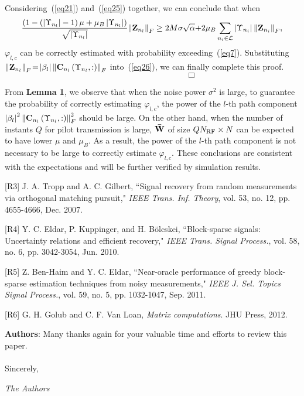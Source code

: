 \documentclass[a4paper,12pt]{article}
\begin{document}
{\begin{framed}
{\begin{equation}
\end{equation}
Considering~(\ref{eq21}) and~(\ref{eq25}) together, we can conclude that when
\begin{equation}\label{eq26}
\frac{{\left( {1 - \left( {\left| {{\Upsilon _{{n_l}}}} \right| - 1} \right)\mu  + {\mu _B}\left| {{\Upsilon _{{n_l}}}} \right|} \right)}}{{\sqrt {\left| {{\Upsilon _{{n_l}}}} \right|} }}{\left\| {{{\bf{Z}}_{{n_l}}}} \right\|_F} \ge 2M\sigma \sqrt \alpha  {\rm{ + }}2{\mu _B}\sum\limits_{{n_i} \in {\cal L}} {\left| {{\Upsilon _{{n_i}}}} \right|{{\left\| {{{\bf{Z}}_{{n_i}}}} \right\|}_F}} ,
\end{equation}
${{\varphi _{l,c}}}$  can be correctly estimated with probability exceeding~(\ref{eq7}). Substituting ${{\left\| {{{\bf{Z}}_{{n_l}}}} \right\|_F} \!=\! \left| {{\beta _l}} \right|{\left\| {{{\bf{C}}_{{n_l}}}\left( {{\Upsilon _{{n_l}}},:} \right)} \right\|_F}}$ into~(\ref{eq26}), we can finally complete this proof. ${\quad \quad \quad \quad \quad \quad \quad \quad \quad \quad \quad \quad \quad \quad \quad \quad \quad \quad \quad \quad \quad \; \; \; \; \Box}$

From \textbf{Lemma 1}, we observe that when the noise power ${{\sigma ^2}}$ is large, to guarantee the probability of correctly estimating ${{\varphi _{l,c}}}$, the power of the ${l}$-th path component ${{\left| {{\beta _l}} \right|^2}\left\| {{{\bf{C}}_{{n_l}}}\left( {{\Upsilon _{{n_l}}},:} \right)} \right\|_F^2}$ should be large. On the other hand, when the number of instants ${Q}$ for pilot transmission is large, ${{\bf{\bar W}}}$ of size ${Q{N_{{\rm{RF}}}} \times N}$ can be expected to have lower ${\mu}$ and ${{\mu _B}}$. As a result, the power of the ${l}$-th path component is not necessary to be large to correctly estimate ${{\varphi _{l,c}}}$. These conclusions are consistent with the expectations and will be further verified by simulation results.}
\end{framed}


[R3] J. A. Tropp and A. C. Gilbert, ``Signal recovery from random measurements via orthogonal matching pursuit," {\it IEEE Trans. Inf. Theory}, vol. 53, no. 12, pp. 4655-4666, Dec. 2007.

[R4] Y. C. Eldar, P. Kuppinger, and H. B\"{o}lcskei, ``Block-sparse signals: Uncertainty relations and efficient recovery," {\it IEEE Trans. Signal Process.}, vol. 58, no. 6, pp. 3042-3054, Jun. 2010.

[R5] Z. Ben-Haim and Y. C. Eldar, ``Near-oracle performance of greedy block-sparse estimation techniques from noisy measurements," {\it IEEE J. Sel. Topics Signal Process.}, vol. 59, no. 5, pp. 1032-1047, Sep. 2011.

[R6] G. H. Golub and C. F. Van Loan, {\it Matrix computations}. JHU Press, 2012.


}


\vbox{}

{\color{blue} \textbf{Authors}: Many thanks again for your valuable time and efforts to review this paper.
\\
\\
Sincerely,

 {\it The Authors}}
\end{document}
